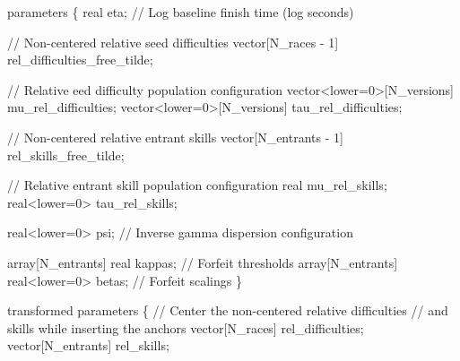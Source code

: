 \documentclass[
  letterpaper,
  DIV=11,
  numbers=noendperiod]{scrartcl}
\newenvironment{Shaded}{\begin{snugshade}}{\end{snugshade}}
\newcommand{\CommentTok}[1]{\textcolor[rgb]{0.37,0.37,0.37}{#1}}
\newcommand{\DataTypeTok}[1]{\textcolor[rgb]{0.68,0.00,0.00}{#1}}
\newcommand{\DecValTok}[1]{\textcolor[rgb]{0.68,0.00,0.00}{#1}}
\newcommand{\KeywordTok}[1]{\textcolor[rgb]{0.00,0.23,0.31}{#1}}
\newcommand{\NormalTok}[1]{\textcolor[rgb]{0.00,0.23,0.31}{#1}}
\begin{document}
\begin{codelisting}
\begin{Shaded}
\begin{Highlighting}[]
\KeywordTok{parameters}\NormalTok{ \{}
  \DataTypeTok{real}\NormalTok{ eta; }\CommentTok{// Log baseline finish time (log seconds)}

  \CommentTok{// Non{-}centered relative seed difficulties}
  \DataTypeTok{vector}\NormalTok{[N\_races {-} }\DecValTok{1}\NormalTok{] rel\_difficulties\_free\_tilde;}

  \CommentTok{// Relative eed difficulty population configuration}
  \DataTypeTok{vector}\NormalTok{\textless{}}\KeywordTok{lower}\NormalTok{=}\DecValTok{0}\NormalTok{\textgreater{}[N\_versions] mu\_rel\_difficulties;}
  \DataTypeTok{vector}\NormalTok{\textless{}}\KeywordTok{lower}\NormalTok{=}\DecValTok{0}\NormalTok{\textgreater{}[N\_versions] tau\_rel\_difficulties;}

  \CommentTok{// Non{-}centered relative entrant skills}
  \DataTypeTok{vector}\NormalTok{[N\_entrants {-} }\DecValTok{1}\NormalTok{] rel\_skills\_free\_tilde;}

  \CommentTok{// Relative entrant skill population configuration}
  \DataTypeTok{real}\NormalTok{ mu\_rel\_skills;}
  \DataTypeTok{real}\NormalTok{\textless{}}\KeywordTok{lower}\NormalTok{=}\DecValTok{0}\NormalTok{\textgreater{} tau\_rel\_skills;}

  \DataTypeTok{real}\NormalTok{\textless{}}\KeywordTok{lower}\NormalTok{=}\DecValTok{0}\NormalTok{\textgreater{} psi; }\CommentTok{// Inverse gamma dispersion configuration}

  \DataTypeTok{array}\NormalTok{[N\_entrants] }\DataTypeTok{real}\NormalTok{ kappas;         }\CommentTok{// Forfeit thresholds}
  \DataTypeTok{array}\NormalTok{[N\_entrants] }\DataTypeTok{real}\NormalTok{\textless{}}\KeywordTok{lower}\NormalTok{=}\DecValTok{0}\NormalTok{\textgreater{} betas; }\CommentTok{// Forfeit scalings}
\NormalTok{\}}

\KeywordTok{transformed parameters}\NormalTok{ \{}
  \CommentTok{// Center the non{-}centered relative difficulties}
  \CommentTok{// and skills while inserting the anchors}
  \DataTypeTok{vector}\NormalTok{[N\_races] rel\_difficulties;}
  \DataTypeTok{vector}\NormalTok{[N\_entrants] rel\_skills;}


\end{Highlighting}
\end{Shaded}
\end{codelisting}
\end{document}
